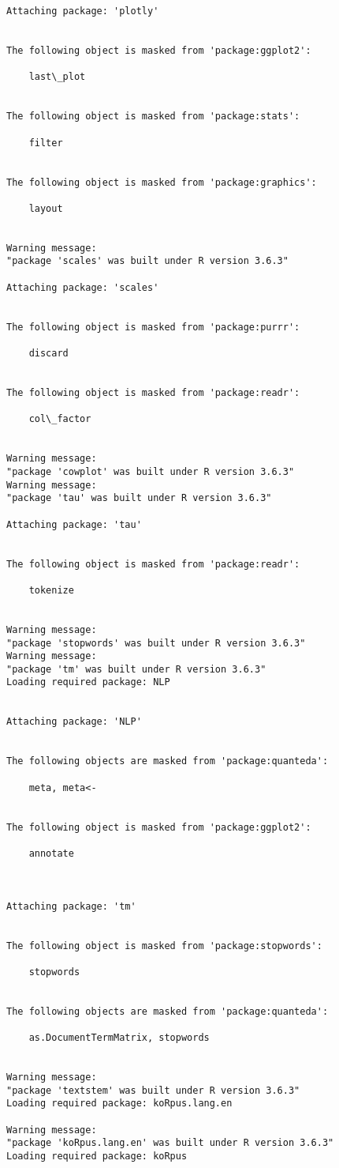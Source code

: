 \documentclass[11pt]{article}
\begin{document}
\begin{Verbatim}[commandchars=\\\{\}]
Attaching package: 'plotly'


The following object is masked from 'package:ggplot2':

    last\_plot


The following object is masked from 'package:stats':

    filter


The following object is masked from 'package:graphics':

    layout


Warning message:
"package 'scales' was built under R version 3.6.3"

Attaching package: 'scales'


The following object is masked from 'package:purrr':

    discard


The following object is masked from 'package:readr':

    col\_factor


Warning message:
"package 'cowplot' was built under R version 3.6.3"
Warning message:
"package 'tau' was built under R version 3.6.3"

Attaching package: 'tau'


The following object is masked from 'package:readr':

    tokenize


Warning message:
"package 'stopwords' was built under R version 3.6.3"
Warning message:
"package 'tm' was built under R version 3.6.3"
Loading required package: NLP


Attaching package: 'NLP'


The following objects are masked from 'package:quanteda':

    meta, meta<-


The following object is masked from 'package:ggplot2':

    annotate



Attaching package: 'tm'


The following object is masked from 'package:stopwords':

    stopwords


The following objects are masked from 'package:quanteda':

    as.DocumentTermMatrix, stopwords


Warning message:
"package 'textstem' was built under R version 3.6.3"
Loading required package: koRpus.lang.en

Warning message:
"package 'koRpus.lang.en' was built under R version 3.6.3"
Loading required package: koRpus


\end{Verbatim}
\end{document}

